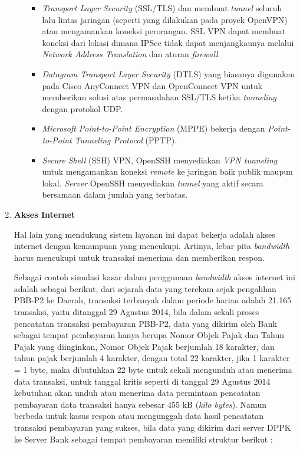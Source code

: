 \documentclass[pdftex,12pt, oneside]{article}
\begin{document}
\begin{enumerate}
\begin{enumerate}
\begin{itemize}
    \item \textit{Transport Layer Security} (SSL/TLS) dan membuat \textit{tunnel} seluruh lalu lintas jaringan (seperti yang dilakukan pada proyek OpenVPN) atau mengamankan koneksi perorangan. SSL VPN dapat membuat koneksi dari lokasi dimana IPSec tidak dapat menjangkaunya melalui \textit{Network Address Translation} dan aturan \textit{firewall}.
    
    \item \textit{Datagram Transport Layer Security} (DTLS) yang biasanya digunakan pada Cisco AnyConnect VPN dan OpenConnect VPN untuk memberikan solusi atas permasalahan SSL/TLS ketika \textit{tunneling} dengan protokol UDP.
    
    \item \textit{Microsoft Point-to-Point Encryption} (MPPE) bekerja dengan \textit{Point-to-Point Tunneling Protocol} (PPTP).
    
    \item \textit{Secure Shell} (SSH) VPN, OpenSSH menyediakan \textit{VPN tunneling} untuk mengamankan koneksi \textit{remote} ke jaringan baik publik maupun lokal. \textit{Server} OpenSSH menyediakan \textit{tunnel} yang aktif secara bersamaan dalam jumlah yang terbatas.
  \end{itemize}
  
\end{enumerate}

\item \textbf{Akses Internet}

Hal lain yang mendukung sistem layanan ini dapat bekerja adalah akses internet dengan kemampuan yang mencukupi. Artinya, lebar pita \textit{bandwidth} harus mencukupi untuk transaksi menerima dan memberikan respon.

Sebagai contoh simulasi kasar dalam penggunaan \textit{bandwidth} akses internet ini adalah sebagai berikut, dari sejarah data yang terekam sejak pengalihan PBB-P2 ke Daerah, transaksi terbanyak dalam periode harian adalah 21.165 transaksi, yaitu ditanggal 29 Agustus 2014, bila dalam sekali proses pencatatan transaksi pembayaran PBB-P2, data yang dikirim oleh Bank sebagai tempat pembayaran hanya berupa Nomor Objek Pajak dan Tahun Pajak yang diinginkan, Nomor Objek Pajak berjumlah 18 karakter, dan tahun pajak berjumlah 4 karakter, dengan total 22 karakter, jika 1 karakter = 1 byte, maka dibutuhkan 22 byte untuk sekali mengunduh atau menerima data transaksi, untuk tanggal kritis seperti di tanggal 29 Agustus 2014 kebutuhan akan unduh atau menerima data permintaan pencatatan pembayaran data transaksi hanya sebesar 455 kB (\textit{kilo bytes}). Namun berbeda untuk kasus respon atau mengunggah data hasil pencatatan transaksi pembayaran yang sukses, bila data yang dikirim dari server DPPK ke Server Bank sebagai tempat pembayaran memiliki struktur berikut :


\end{enumerate}
\end{document}
